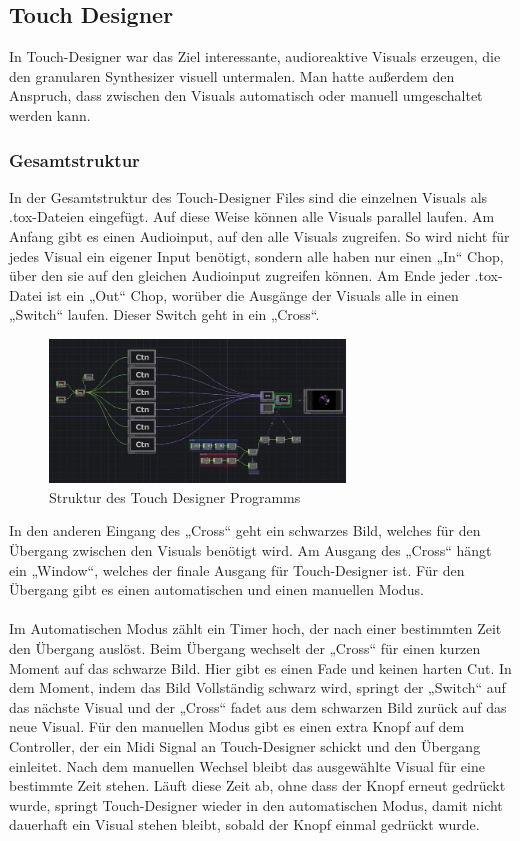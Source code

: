 \documentclass[12pt]{scrartcl}%
\theoremstyle{nonumberplain}
\begin{document}
\newpage

\subsection{Touch Designer}

In Touch-Designer war das Ziel interessante, audioreaktive Visuals erzeugen, die den granularen Synthesizer visuell untermalen. Man hatte außerdem den Anspruch, dass zwischen den Visuals automatisch oder manuell umgeschaltet werden kann.

\subsubsection{Gesamtstruktur}

In der Gesamtstruktur des Touch-Designer Files sind die einzelnen Visuals als .tox-Dateien eingefügt. Auf diese Weise können alle Visuals parallel laufen. Am Anfang gibt es einen Audioinput, auf den alle Visuals zugreifen. So wird nicht für jedes Visual ein eigener Input benötigt, sondern alle haben nur einen „In“ Chop, über den sie auf den gleichen Audioinput zugreifen können. Am Ende jeder .tox-Datei ist ein „Out“ Chop, worüber die Ausgänge der Visuals alle in einen „Switch“ laufen. Dieser Switch geht in ein „Cross“.
\begin{figure}
  \centering
  \includegraphics[width=0.7\textwidth]{td_1}
  \caption{Struktur des Touch Designer Programms}
\end{figure}

\noindent In den anderen Eingang des „Cross“ geht ein schwarzes Bild, welches für den Übergang zwischen den Visuals benötigt wird. Am Ausgang des „Cross“ hängt ein „Window“, welches der finale Ausgang für Touch-Designer ist. Für den Übergang gibt es einen automatischen und einen manuellen Modus.
\\\\
Im Automatischen Modus zählt ein Timer hoch, der nach einer bestimmten Zeit den Übergang auslöst. Beim Übergang wechselt der „Cross“ für einen kurzen Moment auf das schwarze Bild. Hier gibt es einen Fade und keinen harten Cut. In dem Moment, indem das Bild Vollständig schwarz wird, springt der „Switch“ auf das nächste Visual und der „Cross“ fadet aus dem schwarzen Bild zurück auf das neue Visual. Für den manuellen Modus gibt es einen extra Knopf auf dem Controller, der ein Midi Signal an Touch-Designer schickt und den Übergang einleitet. Nach dem manuellen Wechsel bleibt das ausgewählte Visual für eine bestimmte Zeit stehen. Läuft diese Zeit ab, ohne dass der Knopf erneut gedrückt wurde, springt Touch-Designer wieder in den automatischen Modus, damit nicht dauerhaft ein Visual stehen bleibt, sobald der Knopf einmal gedrückt wurde. 
\end{document}
